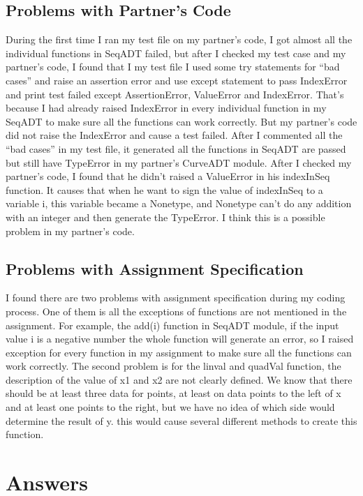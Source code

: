\documentclass[12pt]{article}
\begin{document}
\subsection{Problems with Partner's Code}
During the first time I ran my test file on my partner’s code, I got almost all the individual functions in SeqADT failed, but after I checked my test case and my partner’s code, I found that I my test file I used some try statements for “bad cases” and raise an assertion error and use except statement to pass IndexError and print test failed except AssertionError, ValueError and IndexError. That’s because I had already raised IndexError in every individual function in my SeqADT to make sure all the functions can work correctly. But my partner’s code did not raise the IndexError and cause a test failed. After I commented all the “bad cases” in my test file, it generated all the functions in SeqADT are passed but still have TypeError in my partner’s CurveADT module. After I checked my partner’s code, I found that he didn’t raised a ValueError in his indexInSeq function. It causes that when he want to sign the value of indexInSeq to a variable i, this variable became a Nonetype, and Nonetype can’t do any addition with an integer and then generate the TypeError. I think this is a possible problem in my partner’s code.
\subsection{Problems with Assignment Specification}
I found there are two problems with assignment specification during my coding process. One of them is all the exceptions of functions are not mentioned in the assignment. For example, the add(i) function in SeqADT module, if the input value i is a negative number the whole function will generate an error, so I raised exception for every function in my assignment to make sure all the functions can work correctly. The second problem is for the linval and quadVal function, the description of the value of x1 and x2 are not clearly defined. We know that there should be at least three data for points, at least on data points to the left of x and at least one points to the right, but we have no idea of which side would determine the result of y. this would cause several different methods to create this function. 
\section{Answers}
\end{document}
